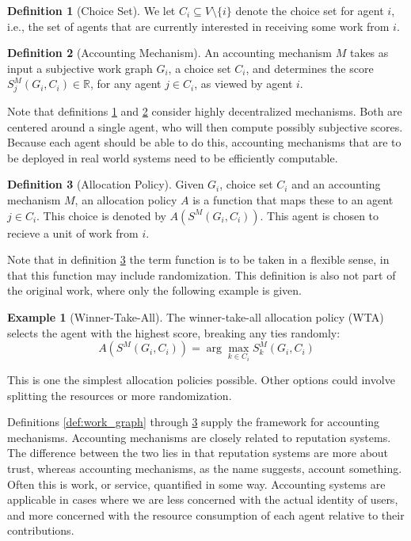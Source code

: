 \documentclass[a4paper,11pt]{book}
\newcommand{\bb}{\mathbb}
\theoremstyle{definition}
\newtheorem{definition}{Definition}
\newtheorem*{example}{Example}
\begin{document}
\begin{definition}[Choice Set]
    We let $C_i \subseteq V \setminus \{i\}$ denote the choice set for agent $i$, i.e., the set of agents that
    are currently interested in receiving some work from $i$.
    \label{def:choice_set}
\end{definition}

\begin{definition}[Accounting Mechanism]
   An accounting mechanism $M$ takes as input a subjective work graph $G_i$, a choice set $C_i$, and
   determines the score $S_j^M(G_i, C_i) \in \bb{R}$, for any agent $j \in C_i$, as viewed by agent
   $i$.
   \label{def:acc_mech}
\end{definition}

Note that definitions \ref{def:choice_set} and \ref{def:acc_mech} consider highly decentralized mechanisms.
Both are centered around a single agent, who will then compute possibly subjective scores. Because each
agent should be able to do this, accounting mechanisms that are to be deployed in real world systems need
to be efficiently computable. 

\begin{definition}[Allocation Policy]
    Given $G_i$, choice set $C_i$ and an accounting mechanism $M$, an allocation policy $A$
    is a function that maps these to an agent $j \in C_i$. This choice is denoted
    by $A(S^M(G_i, C_i))$. This agent is chosen to recieve a unit of work from $i$.
    \label{def:all_pol}
\end{definition}

Note that in definition \ref{def:all_pol} the term function is to be taken in a flexible sense,
in that this function may include randomization. This definition is also not part of the original work,
where only the following example is given.

\begin{example}[Winner-Take-All]
   The winner-take-all allocation policy (WTA) selects the agent with the highest score,
   breaking any ties randomly:
   \begin{equation*}
       A(S^M(G_i, C_i)) = \arg \max_{k\in C_i} S_k^M(G_i, C_i) 
   \end{equation*}
\end{example}

This is one the simplest allocation policies possible. Other options could involve  
splitting the resources or more randomization.

Definitions \ref{def:work_graph} through \ref{def:all_pol} supply the framework for accounting
mechanisms. Accounting mechanisms are closely related to reputation systems. The difference
between the two lies in that reputation systems are more about trust, whereas accounting mechanisms,
as the name suggests, account something. Often this is work, or service, quantified in some way.
Accounting systems are applicable in cases where we are less concerned with the actual identity
of users, and more concerned with the resource consumption of each agent relative to their contributions.
\end{document}
